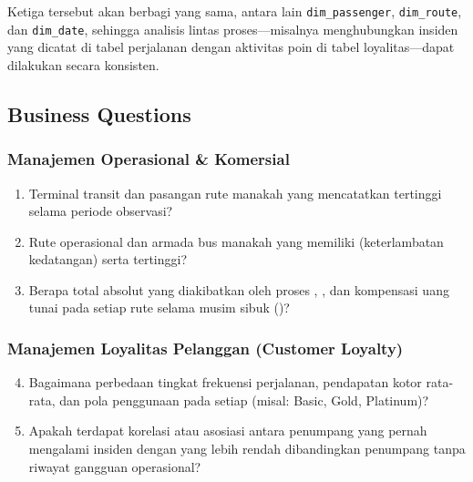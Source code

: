 Ketiga  tersebut akan berbagi  yang sama, antara lain \texttt{dim\_passenger}, \texttt{dim\_route}, dan \texttt{dim\_date}, sehingga analisis lintas proses—misalnya menghubungkan insiden  yang dicatat di tabel perjalanan dengan aktivitas  poin di tabel loyalitas—dapat dilakukan secara konsisten.

\subsection{Business Questions}

\subsubsection{Manajemen Operasional \& Komersial}
\begin{enumerate}
    \item Terminal transit dan pasangan rute manakah yang mencatatkan  tertinggi selama periode observasi?
    \item Rute operasional dan armada bus manakah yang memiliki  (keterlambatan kedatangan) serta  tertinggi?
    \item Berapa total  absolut yang diakibatkan oleh proses , , dan kompensasi uang tunai pada setiap rute selama musim sibuk ()?
\end{enumerate}

\subsubsection{Manajemen Loyalitas Pelanggan (Customer Loyalty)}
\begin{enumerate}
    \setcounter{enumi}{3}
    \item Bagaimana perbedaan tingkat frekuensi perjalanan, pendapatan kotor rata-rata, dan pola penggunaan  pada setiap  (misal: Basic, Gold, Platinum)?
    \item Apakah terdapat korelasi atau asosiasi antara penumpang yang pernah mengalami insiden  dengan  yang lebih rendah dibandingkan penumpang tanpa riwayat gangguan operasional?
\end{enumerate}

